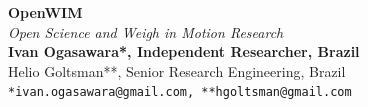 \documentclass[a0,portrait]{a0poster}
\begin{document}


\begin{minipage}[b]{0.75\linewidth}
\veryHuge \color{black} \textbf{OpenWIM} \color{Black}\\ %
\Huge\textit{Open Science and Weigh in Motion Research}\\[2cm] %
\huge \textbf{Ivan Ogasawara*, Independent Researcher, Brazil}\\[0.5cm] %
\huge Helio Goltsman**, Senior Research Engineering, Brazil\\[0.4cm] %
\Large \texttt{*ivan.ogasawara@gmail.com, **hgoltsman@gmail.com}
\tiny \\
\end{minipage}
%


\end{document}
